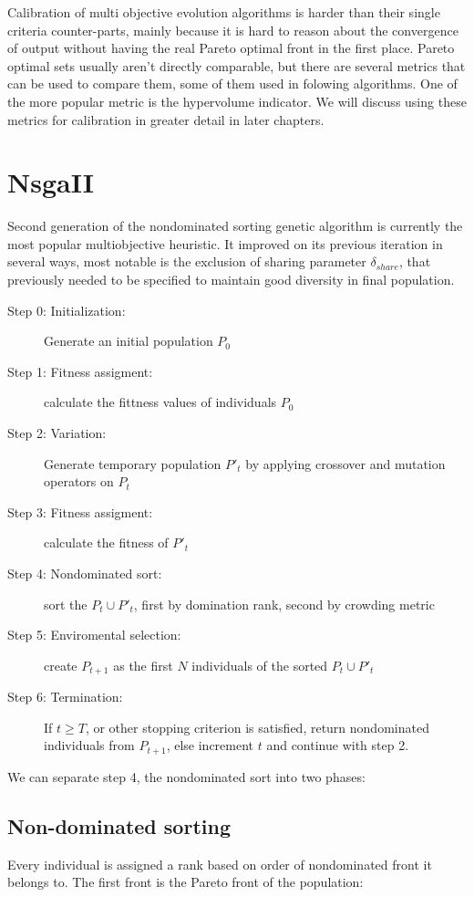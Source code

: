 \documentclass[12pt,oneside]{fithesis2}
\begin{document}
Calibration of multi objective evolution algorithms is harder than their single criteria counter-parts, mainly because it is hard to reason about the convergence of output without having the real Pareto optimal front in the first place. Pareto optimal sets usually aren't directly comparable, but there are several metrics that can be used to compare them, some of them used in folowing algorithms. One of the more popular metric is the hypervolume indicator. We will discuss using these metrics for calibration in greater detail in later chapters.

\section{NsgaII}
Second generation of the nondominated sorting genetic algorithm\cite{deb2002fast} is currently the most popular multiobjective heuristic. It improved on its previous iteration in several ways, most notable is the exclusion of sharing parameter $\delta_{share}$, that previously needed to be specified to maintain good diversity in final population.

\begin{description}
	\item[Step 0: Initialization:] Generate an initial population $P_0$ 
	\item[Step 1: Fitness assigment:] calculate the fittness values of individuals $P_0$
	\item[Step 2: Variation:] Generate temporary population $P'_t$ by applying crossover and mutation operators on $P_t$
	\item[Step 3: Fitness assigment:] calculate the fitness of $P'_t$
	\item[Step 4: Nondominated sort:] sort the $P_t \cup P'_t$, first by domination rank, second by crowding metric
	\item[Step 5: Enviromental selection:] create $P_{t+1}$ as the first $N$ individuals of the sorted $P_t \cup P'_t$
	\item[Step 6: Termination:] If $t \geq T$, or other stopping criterion is satisfied, return nondominated individuals from $P_{t+1}$, else increment $t$ and continue with step 2.
\end{description}

We can separate step 4, the nondominated sort into two phases:

\subsection{Non-dominated sorting}
Every individual is assigned a rank based on order of nondominated front it belongs to. The first front is the Pareto front of the population:
\end{document}
